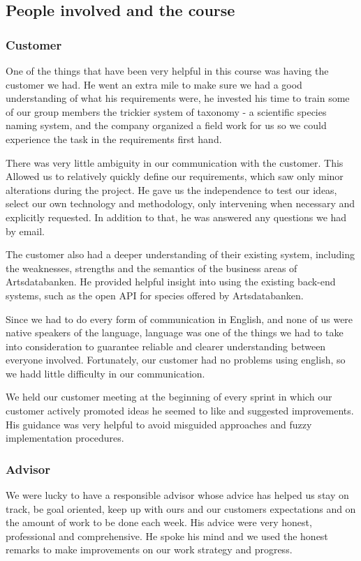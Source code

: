 \subsection{People involved and the course}
	\subsubsection{Customer}

One of the things that have been very helpful in this course was having the
customer we had. He went an extra mile to make sure we had a good understanding
of what his requirements were, he invested his time to train some of our
group members the trickier system of taxonomy - a scientific species naming
system, and the company organized a field work for us so we could experience the
task in the requirements first hand.

There was very little ambiguity in our communication with the customer. This 
Allowed us to relatively quickly define our requirements, which saw only minor alterations during the project.
He gave us the independence to test our
ideas, select our own technology and methodology, only intervening when
necessary and explicitly requested. In addition to that, he was answered any questions we had by email.

The customer also had a deeper understanding of their existing system, including
the weaknesses, strengths and the semantics of the business areas of
Artsdatabanken. He provided helpful insight into using the existing 
back-end systems, such as the open API for species offered by Artsdatabanken.

Since we had to do every form of communication in English, and none of us were
native speakers of the language, language was one of the things we had to take
into consideration to guarantee reliable and clearer understanding between
everyone involved. Fortunately, our customer had no problems using english, so we hadd little difficulty in our communication.

We held our customer meeting at the beginning of every sprint in which our customer
actively promoted ideas he seemed to like and suggested improvements.  His
guidance was very helpful to avoid misguided approaches and fuzzy implementation
procedures.

	\subsubsection{Advisor}
We were lucky to have a responsible advisor whose  advice has
helped us stay on track, be goal oriented, keep up with ours and our
customers expectations and on the amount of work to be done each week. His
advice were very honest, professional and comprehensive. He spoke his mind and
we used the honest remarks to make improvements on our work strategy and
progress.

